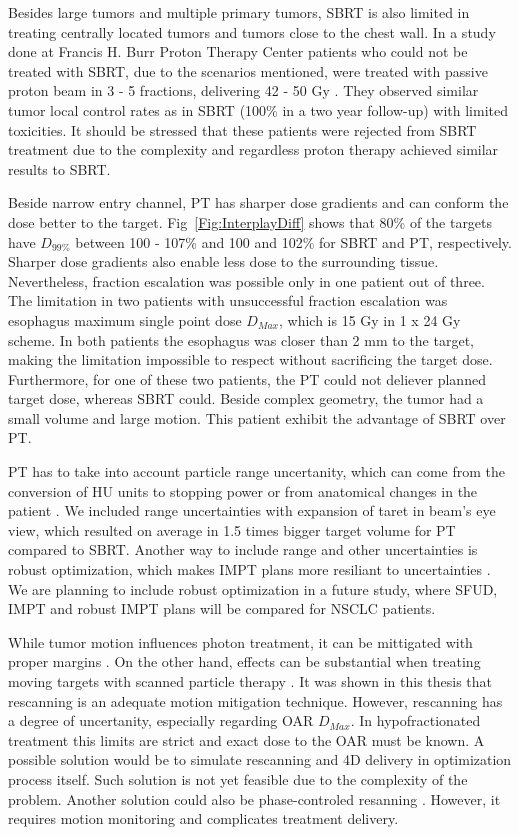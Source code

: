 Besides large tumors and multiple primary tumors, SBRT is also limited in treating centrally located tumors and tumors close to the chest wall.
In a study done at Francis H. Burr Proton Therapy Center 
patients who could not be treated with SBRT, due to the scenarios mentioned, were treated with passive proton beam in 3 - 5 fractions, 
delivering 42 - 50 Gy \cite{Westover2012}. They observed similar tumor local control rates as in SBRT (100\% in a two year follow-up) with limited toxicities. 
It should be stressed that these patients were rejected from SBRT treatment due to the complexity and regardless proton therapy achieved similar results
to SBRT.

Beside narrow entry channel, PT has sharper dose gradients and can conform the dose better to the target. Fig~\ref{Fig:InterplayDiff} shows that 80\% of the targets have $D_{99\%}$
between 100 - 107\% and 100 and 102\% for SBRT and PT, respectively. Sharper dose gradients also enable less dose to the surrounding tissue. Nevertheless, fraction escalation
was possible only in one patient out of three. The limitation in two patients with unsuccessful fraction escalation was esophagus maximum single point dose $D_{Max}$, 
which is 15 Gy in 1 x 24 Gy scheme. In both patients the esophagus was closer than 2 mm to the target, making the limitation impossible to respect without sacrificing the target dose.
Furthermore, for one of these two patients, the PT could not deliever planned target dose, whereas SBRT could. Beside complex geometry, the tumor had a small volume and 
large motion. This patient exhibit the advantage of SBRT over PT.

PT has to take into account particle range uncertanity, which can come from the conversion of HU units to stopping power \cite{Schneider1996}
or from anatomical changes in the patient \cite{Unkelbach2009}. We included range uncertainties with expansion of taret in beam's eye view, which resulted on average in 1.5 times bigger
target volume for PT compared to SBRT. Another way to include range and other uncertainties is robust optimization, which makes IMPT plans more resiliant to uncertainties \cite{Unkelbach2009, Chen2012}.
We are planning to include robust optimization in a future study, where SFUD, IMPT and robust IMPT plans will be compared for NSCLC patients.

While tumor motion influences photon treatment, it can be mittigated with proper margins \cite{Zou2014}. 
On the other hand, effects can be substantial when treating moving targets with scanned particle therapy \cite{Bert2008}.
It was shown in this thesis that rescanning is an adequate motion mitigation technique. However, rescanning has a degree of uncertanity, 
especially regarding OAR $D_{Max}$.
In hypofractionated treatment this limits are strict and exact dose to the OAR must be known. 
A possible solution would be to simulate rescanning and 4D delivery in optimization process itself. 
Such solution is not yet feasible due to the complexity of the problem. Another solution could also be phase-controled resanning \cite{Mori2013,Takahashi2014}. However,
it requires motion monitoring and complicates treatment delivery.

